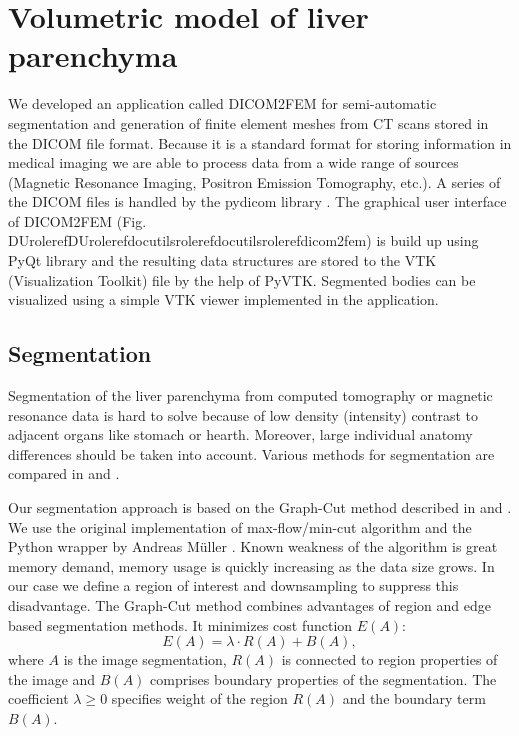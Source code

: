 \documentclass[letterpaper,compsoc,twoside]{IEEEtran}
\providecommand*{\DUrole}[2]{\ifcsname DUrole#1\endcsname \csname DUrole#1\endcsname{#2}\else \ifcsname docutilsrole#1\endcsname \csname docutilsrole#1\endcsname{#2}\else #2\fi \fi }
\begin{document}
\section{Volumetric model of liver parenchyma\label{volumetric-model-of-liver-parenchyma}}


We developed an application called DICOM2FEM \cite{Luk14} for semi-automatic
segmentation and generation of finite element meshes from CT scans
stored in the DICOM file format. Because it is a standard format for
storing information in medical imaging we are able to process data
from a wide range of sources (Magnetic Resonance Imaging, Positron
Emission Tomography, etc.). A series of the DICOM files is handled by
the pydicom library \cite{Mas14}. The graphical user interface of DICOM2FEM
(Fig. \DUrole{ref}{dicom2fem}) is build up using PyQt library and the
resulting data structures are stored to the VTK (Visualization
Toolkit) file by the help of PyVTK. Segmented bodies can be visualized
using a simple VTK viewer implemented in the application.

\subsection{Segmentation\label{segmentation}}


Segmentation of the liver parenchyma from computed tomography or
magnetic resonance data is hard to solve because of low density
(intensity) contrast to adjacent organs like stomach or
hearth. Moreover, large individual anatomy differences should be taken
into account. Various methods for segmentation are compared in
\cite{Mha12} and \cite{Hei09}.



Our segmentation approach is based on the Graph-Cut method described
in \cite{Boy01} and \cite{Boy06}. We use the original implementation of
max-flow/min-cut algorithm \cite{Kol14} and the Python wrapper by Andreas
Müller \cite{Mül14}. Known weakness of the algorithm is great memory demand,
memory usage is quickly increasing as the data size grows. In our case
we define a region of interest and downsampling to suppress this
disadvantage. The Graph-Cut method combines advantages of region and
edge based segmentation methods. It minimizes cost function
$E(A)$:\begin{equation}
\label{segment1}
E(A) = \lambda \cdot R(A) + B (A),
\end{equation}where $A$ is the image segmentation, $R(A)$ is connected
to region properties of the image and $B(A)$ comprises boundary
properties of the segmentation. The coefficient $\lambda \geq 0$
specifies weight of the region $R(A)$ and the boundary term
$B(A)$.
\end{document}
